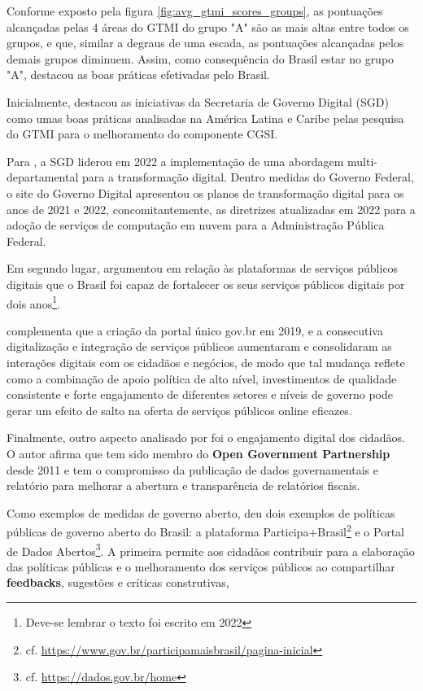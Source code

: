 Conforme exposto pela figura \ref{fig:avg_gtmi_scores_groups}, as pontuações alcançadas pelas 4 áreas do GTMI do grupo "A" são as mais altas entre todos os grupos, e que, similar a degraus de uma escada, as pontuações alcançadas pelos demais grupos diminuem. Assim, como consequência do Brasil estar no grupo "A", \cite{gtmi_2022_latinamerica} destacou as boas práticas efetivadas pelo Brasil. 

Inicialmente, \cite{gtmi_2022_latinamerica} destacou as iniciativas da Secretaria de Governo Digital (SGD) como umas boas práticas analisadas na América Latina e Caribe pelas pesquisa do GTMI para o melhoramento do componente CGSI. 

Para \cite{gtmi_2022_latinamerica}, a SGD liderou em 2022 a implementação de uma abordagem multi-departamental para a transformação digital. Dentro medidas do Governo Federal, o site do Governo Digital apresentou os planos de transformação digital para os anos de 2021 e 2022, concomitantemente, as diretrizes atualizadas em 2022 para a adoção de serviços de computação em nuvem para a Administração Pública Federal.

Em segundo lugar, \cite{gtmi_2022_latinamerica} argumentou em relação às plataformas de serviços públicos digitais que o Brasil foi capaz de fortalecer os seus serviços públicos digitais por dois anos\footnote{Deve-se lembrar o texto foi escrito em 2022}. 

\cite{gtmi_2022_latinamerica} complementa que a criação da portal único gov.br em 2019, e a consecutiva digitalização e integração de serviços públicos aumentaram e consolidaram as interações digitais com os cidadãos e negócios, de modo que tal mudança reflete como a combinação de apoio política de alto nível, investimentos de qualidade consistente e forte engajamento de diferentes setores e níveis de governo pode gerar um efeito de salto na oferta de serviços públicos online eficazes.

Finalmente, outro aspecto analisado por \cite{gtmi_2022_latinamerica} foi o engajamento digital dos cidadãos. O autor afirma que tem sido membro do \textbf{Open Government Partnership} desde 2011 e tem o compromisso da publicação de dados governamentais e relatório para melhorar a abertura e transparência de relatórios fiscais.

Como exemplos de medidas de governo aberto, \cite{gtmi_2022_latinamerica} deu dois exemplos de políticas públicas de governo aberto do Brasil: a plataforma Participa+Brasil\footnote{cf. \url{https://www.gov.br/participamaisbrasil/pagina-inicial}} e o Portal de Dados Abertos\footnote{cf. \url{https://dados.gov.br/home}}. A primeira
permite aos cidadãos contribuir para a elaboração das políticas públicas e o melhoramento dos serviços públicos ao compartilhar \textbf{feedbacks}, sugestões e críticas construtivas, 

